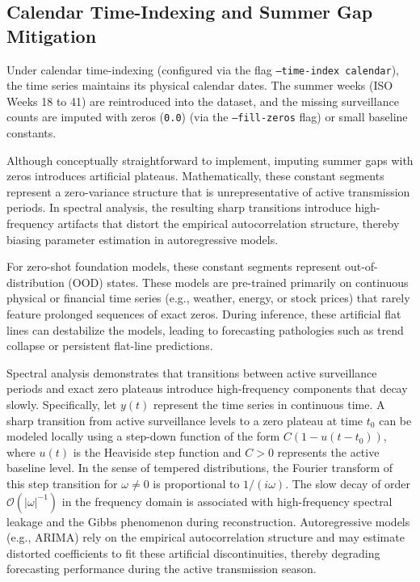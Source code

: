 \subsection{Calendar Time-Indexing and Summer Gap Mitigation}
Under calendar time-indexing (configured via the flag \texttt{--time-index calendar}), the time series maintains its physical calendar dates. The summer weeks (ISO Weeks 18 to 41) are reintroduced into the dataset, and the missing surveillance counts are imputed with zeros (\texttt{0.0}) (via the \texttt{--fill-zeros} flag) or small baseline constants.

Although conceptually straightforward to implement, imputing summer gaps with zeros introduces artificial plateaus. Mathematically, these constant segments represent a zero-variance structure that is unrepresentative of active transmission periods. In spectral analysis, the resulting sharp transitions introduce high-frequency artifacts that distort the empirical autocorrelation structure, thereby biasing parameter estimation in autoregressive models.

For zero-shot foundation models, these constant segments represent out-of-distribution (OOD) states. These models are pre-trained primarily on continuous physical or financial time series (e.g., weather, energy, or stock prices) that rarely feature prolonged sequences of exact zeros. During inference, these artificial flat lines can destabilize the models, leading to forecasting pathologies such as trend collapse or persistent flat-line predictions.

Spectral analysis demonstrates that transitions between active surveillance periods and exact zero plateaus introduce high-frequency components that decay slowly. Specifically, let $y(t)$ represent the time series in continuous time. A sharp transition from active surveillance levels to a zero plateau at time $t_0$ can be modeled locally using a step-down function of the form $C(1 - u(t - t_0))$, where $u(t)$ is the Heaviside step function and $C > 0$ represents the active baseline level. In the sense of tempered distributions, the Fourier transform of this step transition for $\omega \neq 0$ is proportional to $1/(i\omega)$. The slow decay of order $\mathcal{O}(|\omega|^{-1})$ in the frequency domain is associated with high-frequency spectral leakage and the Gibbs phenomenon during reconstruction. Autoregressive models (e.g., ARIMA) rely on the empirical autocorrelation structure and may estimate distorted coefficients to fit these artificial discontinuities, thereby degrading forecasting performance during the active transmission season.

